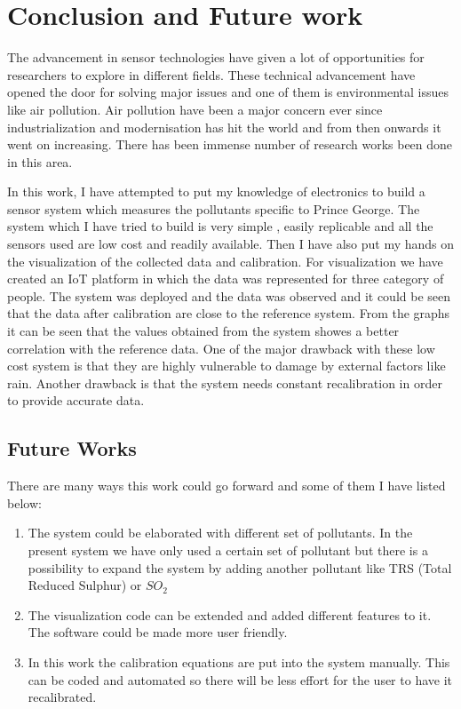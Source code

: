 \chapter{Conclusion and Future work}

The advancement in sensor technologies have given a lot of opportunities for researchers to explore in different fields. These technical advancement have opened the door for solving major issues and one of them is environmental issues like air pollution. Air pollution have been a major concern ever since industrialization and modernisation has hit the world and from then onwards it went on increasing. There has been immense number of research works been done in this area.

In this work, I have attempted to put my knowledge of electronics to build a sensor system which measures the pollutants specific to Prince George. The system which I have tried to build is very simple , easily replicable and all the sensors used are low cost and readily available. Then I have also put my hands on the visualization of the collected data and calibration. For visualization we have created an IoT platform in which the data was represented for three category of people.
The system was deployed and the data was observed and it could be seen that the data after calibration are close to the reference system. From the graphs it can be seen that the values obtained from the system showes a better correlation with the reference data. One of the major drawback with these low cost system is that they are highly vulnerable to damage by external factors like rain. Another drawback is that the system needs constant recalibration in order to provide accurate data.

\section{Future Works}

There are many ways this work could go forward and some of them I have listed below:
\begin{enumerate}
    \item The system could be elaborated with different set of pollutants. In the present system we have only used a certain set of pollutant but there is a possibility to expand the system by adding another pollutant like TRS (Total Reduced Sulphur) or $SO_{2}$
    \item The visualization code can be extended and added different features to it. The software could be made more user friendly.
    \item In this work the calibration equations are put into the system manually. This can be coded and automated so there will be less effort for the user to have it recalibrated.

\end{enumerate}



